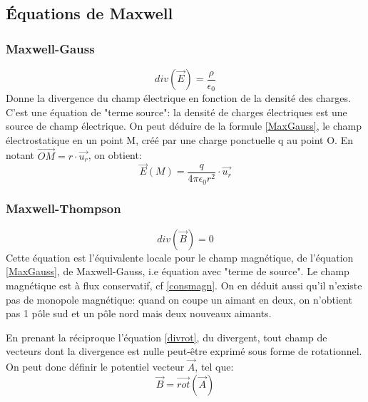 \documentclass[10pt,a4paper]{article}
\begin{document}
\subsection{Équations de Maxwell}
\subsubsection{Maxwell-Gauss}
\begin{equation}
div(\overrightarrow{E}) = \frac{\rho}{\epsilon_{0}}
\label{MaxGauss}
\end{equation}
Donne la divergence du champ électrique en fonction de la densité des charges. C'est une équation de "terme source": la densité de charges électriques est une source de champ électrique.
On peut déduire de la formule \ref{MaxGauss}, le champ électrostatique en un point M, créé par une charge ponctuelle q au point O. En notant $\overrightarrow{OM} = r\cdot\overrightarrow{u_{r}}$, on obtient:
\begin{equation}
\overrightarrow{E}(M) = \frac{q}{4\pi\epsilon_{0}r^{2}}\cdot\overrightarrow{u_{r}}
\end{equation}

\subsubsection{Maxwell-Thompson}
\begin{equation}
div(\overrightarrow{B}) = 0
\label{MaxThom}
\end{equation}
Cette équation est l'équivalente locale pour le champ magnétique, de l'équation \ref{MaxGauss}, de Maxwell-Gauss, i.e équation avec "terme de source". Le champ magnétique est à flux conservatif, cf \ref{consmagn}. On en déduit aussi qu'il n'existe pas de monopole magnétique: quand on coupe un aimant en deux, on n'obtient pas 1 pôle sud et un pôle nord mais deux nouveaux aimants.

En prenant la réciproque l'équation \ref{divrot}, du divergent, tout champ de vecteurs dont la divergence est nulle peut-être exprimé sous forme de rotationnel. On peut donc définir le potentiel vecteur $\overrightarrow{A}$, tel que:
\begin{equation}
\overrightarrow{B} = \overrightarrow{rot}(\overrightarrow{A})
\end{equation}

\end{document}
